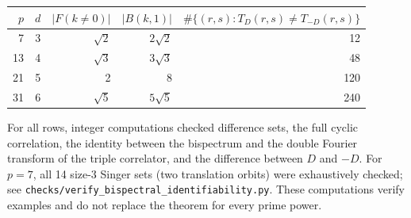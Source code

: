 \documentclass[11pt,a4paper,oneside]{book}
\begin{document}
\begin{center}\begin{tabular}{rrrrr}\toprule
$p$&$d$&$|F(k\ne0)|$&$|B(k,1)|$&$\#\{(r,s):T_D(r,s)\ne T_{-D}(r,s)\}$\\\midrule
7&3&$\sqrt2$&$2\sqrt2$&12\\13&4&$\sqrt3$&$3\sqrt3$&48\\21&5&2&8&120\\31&6&$\sqrt5$&$5\sqrt5$&240\\\bottomrule
\end{tabular}\end{center}
For all rows, integer computations checked difference sets, the full cyclic correlation, the identity between the bispectrum and the double Fourier transform of the triple correlator, and the difference between $D$ and $-D$. For $p=7$, all 14 size-3 Singer sets (two translation orbits) were exhaustively checked; see \texttt{checks/verify\_bispectral\_identifiability.py}. These computations verify examples and do not replace the theorem for every prime power.
\end{document}
